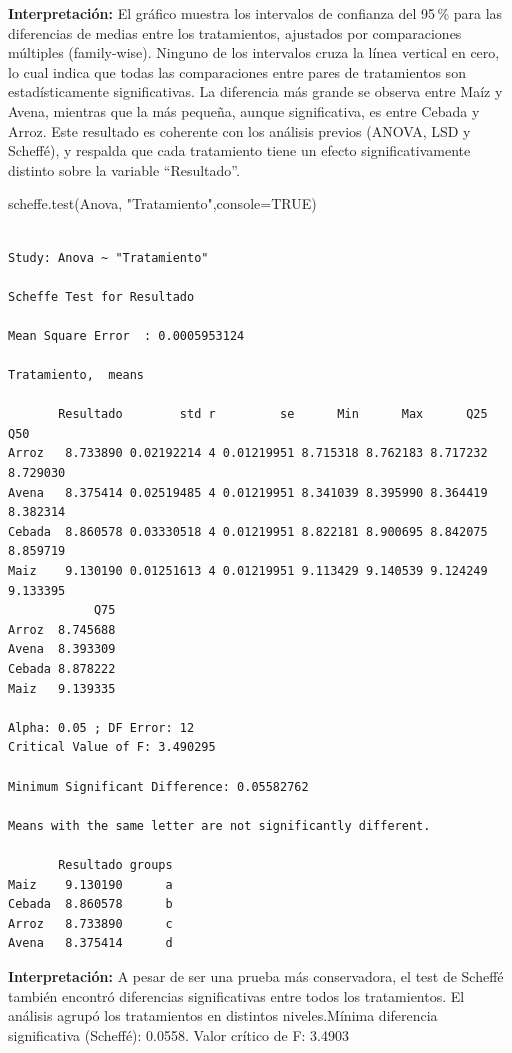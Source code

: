 \documentclass[
  letterpaper,
  DIV=11,
  numbers=noendperiod]{scrreprt}
\newenvironment{Shaded}{\begin{snugshade}}{\end{snugshade}}
\newcommand{\AttributeTok}[1]{\textcolor[rgb]{0.40,0.45,0.13}{#1}}
\newcommand{\ConstantTok}[1]{\textcolor[rgb]{0.56,0.35,0.01}{#1}}
\newcommand{\FunctionTok}[1]{\textcolor[rgb]{0.28,0.35,0.67}{#1}}
\newcommand{\NormalTok}[1]{\textcolor[rgb]{0.00,0.23,0.31}{#1}}
\newcommand{\StringTok}[1]{\textcolor[rgb]{0.13,0.47,0.30}{#1}}
\begin{document}
\textbf{Interpretación:} El gráfico muestra los intervalos de confianza
del 95\,\% para las diferencias de medias entre los tratamientos,
ajustados por comparaciones múltiples (family-wise). Ninguno de los
intervalos cruza la línea vertical en cero, lo cual indica que todas las
comparaciones entre pares de tratamientos son estadísticamente
significativas. La diferencia más grande se observa entre Maíz y Avena,
mientras que la más pequeña, aunque significativa, es entre Cebada y
Arroz. Este resultado es coherente con los análisis previos (ANOVA, LSD
y Scheffé), y respalda que cada tratamiento tiene un efecto
significativamente distinto sobre la variable ``Resultado''.

\begin{Shaded}
\begin{Highlighting}[]
\FunctionTok{scheffe.test}\NormalTok{(Anova, }\StringTok{"Tratamiento"}\NormalTok{,}\AttributeTok{console=}\ConstantTok{TRUE}\NormalTok{)}
\end{Highlighting}
\end{Shaded}

\begin{verbatim}

Study: Anova ~ "Tratamiento"

Scheffe Test for Resultado 

Mean Square Error  : 0.0005953124 

Tratamiento,  means

       Resultado        std r         se      Min      Max      Q25      Q50
Arroz   8.733890 0.02192214 4 0.01219951 8.715318 8.762183 8.717232 8.729030
Avena   8.375414 0.02519485 4 0.01219951 8.341039 8.395990 8.364419 8.382314
Cebada  8.860578 0.03330518 4 0.01219951 8.822181 8.900695 8.842075 8.859719
Maiz    9.130190 0.01251613 4 0.01219951 9.113429 9.140539 9.124249 9.133395
            Q75
Arroz  8.745688
Avena  8.393309
Cebada 8.878222
Maiz   9.139335

Alpha: 0.05 ; DF Error: 12 
Critical Value of F: 3.490295 

Minimum Significant Difference: 0.05582762 

Means with the same letter are not significantly different.

       Resultado groups
Maiz    9.130190      a
Cebada  8.860578      b
Arroz   8.733890      c
Avena   8.375414      d
\end{verbatim}

\textbf{Interpretación:} A pesar de ser una prueba más conservadora, el
test de Scheffé también encontró diferencias significativas entre todos
los tratamientos. El análisis agrupó los tratamientos en distintos
niveles.Mínima diferencia significativa (Scheffé): 0.0558. Valor crítico
de F: 3.4903
\end{document}
